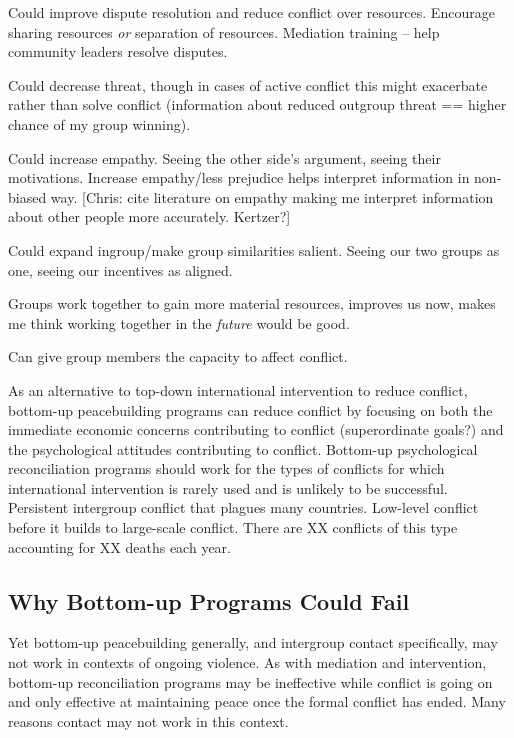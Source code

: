 \documentclass[11pt]{article}
\begin{document}
Could improve dispute resolution and reduce conflict over resources.
Encourage sharing resources \emph{or} separation of resources. Mediation
training -- help community leaders resolve disputes.

Could decrease threat, though in cases of active conflict this might
exacerbate rather than solve conflict (information about reduced
outgroup threat == higher chance of my group winning).

Could increase empathy. Seeing the other side's argument, seeing their
motivations. Increase empathy/less prejudice helps interpret information
in non-biased way. {[}Chris: cite literature on empathy making me
interpret information about other people more accurately. Kertzer?{]}

Could expand ingroup/make group similarities salient. Seeing our two
groups as one, seeing our incentives as aligned.

Groups work together to gain more material resources, improves us now,
makes me think working together in the \emph{future} would be good.

Can give group members the capacity to affect conflict.

As an alternative to top-down international intervention to reduce
conflict, bottom-up peacebuilding programs can reduce conflict by
focusing on both the immediate economic concerns contributing to
conflict (superordinate goals?) and the psychological attitudes
contributing to conflict. Bottom-up psychological reconciliation
programs should work for the types of conflicts for which international
intervention is rarely used and is unlikely to be successful. Persistent
intergroup conflict that plagues many countries. Low-level conflict
before it builds to large-scale conflict. There are XX conflicts of this
type accounting for XX deaths each year.

\subsection{Why Bottom-up Programs Could
Fail}\label{why-bottom-up-programs-could-fail}

Yet bottom-up peacebuilding generally, and intergroup contact
specifically, may not work in contexts of ongoing violence. As with
mediation and intervention, bottom-up reconciliation programs may be
ineffective while conflict is going on and only effective at maintaining
peace once the formal conflict has ended. Many reasons contact may not
work in this context.
\end{document}
